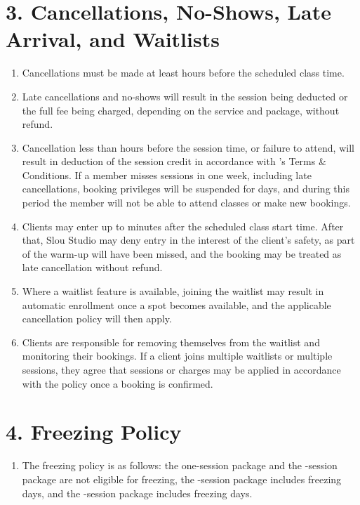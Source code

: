 \documentclass[12pt,a4paper]{article}
\newcommand{\engnum}[1]{\textLR{#1}}
\newcommand{\brand}{\textLR{Slou Studio}}
\begin{document}
\section*{3. Cancellations, No-Shows, Late Arrival, and Waitlists}
\begin{enumerate}
    \item Cancellations must be made at least \engnum{6} hours before the scheduled class time.
    \item Late cancellations and no-shows will result in the session being deducted or the full fee being charged, depending on the service and package, without refund.
    \item Cancellation less than \engnum{6} hours before the session time, or failure to attend, will result in deduction of the session credit in accordance with \brand's Terms \& Conditions. If a member misses \engnum{3} sessions in one week, including late cancellations, booking privileges will be suspended for \engnum{3} days, and during this period the member will not be able to attend classes or make new bookings.    
    \item Clients may enter up to \engnum{15} minutes after the scheduled class start time. After that, Slou Studio may deny entry in the interest of the client’s safety, as part of the warm-up will have been missed, and the booking may be treated as late cancellation without refund.
    \item Where a waitlist feature is available, joining the waitlist may result in automatic enrollment once a spot becomes available, and the applicable cancellation policy will then apply.
    \item Clients are responsible for removing themselves from the waitlist and monitoring their bookings. If a client joins multiple waitlists or multiple sessions, they agree that sessions or charges may be applied in accordance with the policy once a booking is confirmed.
\end{enumerate}

\section*{4. Freezing Policy}
\begin{enumerate}
    \item The freezing policy is as follows: the one-session package and the \engnum{5}-session package are not eligible for freezing, the \engnum{10}-session package includes \engnum{5} freezing days, and the \engnum{20}-session package includes \engnum{10} freezing days.
\end{enumerate}
\end{document}

